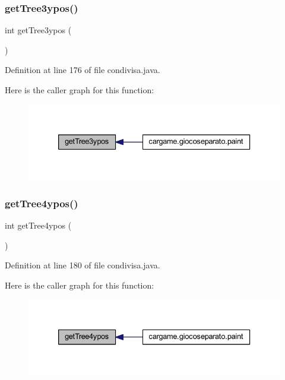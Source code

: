 \subsubsection{\texorpdfstring{get\+Tree3ypos()}{getTree3ypos()}}
{\footnotesize\ttfamily int get\+Tree3ypos (\begin{DoxyParamCaption}{ }\end{DoxyParamCaption})}



Definition at line 176 of file condivisa.\+java.

Here is the caller graph for this function\+:
\nopagebreak
\begin{figure}[H]
\begin{center}
\leavevmode
\includegraphics[width=333pt]{classcargame_1_1condivisa_aca8c6ef62d607dc011069ec395602291_icgraph}
\end{center}
\end{figure}
\mbox{\label{classcargame_1_1condivisa_a361cfa46d2af12ba2dd71c919c963b1a}} 
\subsubsection{\texorpdfstring{get\+Tree4ypos()}{getTree4ypos()}}
{\footnotesize\ttfamily int get\+Tree4ypos (\begin{DoxyParamCaption}{ }\end{DoxyParamCaption})}



Definition at line 180 of file condivisa.\+java.

Here is the caller graph for this function\+:
\nopagebreak
\begin{figure}[H]
\begin{center}
\leavevmode
\includegraphics[width=333pt]{classcargame_1_1condivisa_a361cfa46d2af12ba2dd71c919c963b1a_icgraph}
\end{center}
\end{figure}
\mbox{\label{classcargame_1_1condivisa_ab04fb0bbd43e196f4ce5f693ceeef61d}} 
